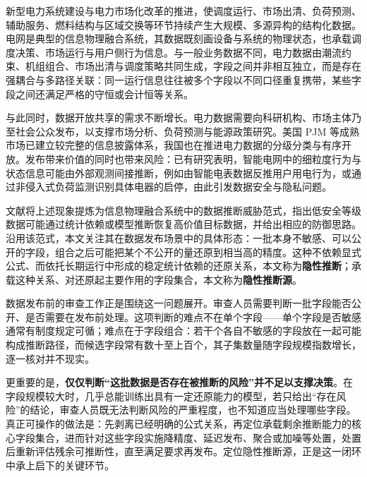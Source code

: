 \documentclass[UTF8,zihao=5,twoside]{ctexart}
\begin{document}
新型电力系统建设与电力市场化改革的推进，使调度运行、市场出清、负荷预测、辅助服务、燃料结构与区域交换等环节持续产生大规模、多源异构的结构化数据\cite{ref-liu-cps,ref-ma-pjm}。电网是典型的信息物理融合系统，其数据既刻画设备与系统的物理状态，也承载调度决策、市场运行与用户侧行为信息。与一般业务数据不同，电力数据由潮流约束、机组组合、市场出清与调度策略共同生成，字段之间并非相互独立，而是存在强耦合与多路径关联：同一运行信息往往被多个字段以不同口径重复携带，某些字段之间还满足严格的守恒或会计恒等关系。

与此同时，数据开放共享的需求不断增长。电力数据需要向科研机构、市场主体乃至社会公众发布，以支撑市场分析、负荷预测与能源政策研究\cite{ref-zhu-sharing}。美国 PJM 等成熟市场已建立较完整的信息披露体系\cite{ref-ma-pjm,ref-pjm-dataminer}，我国也在推进电力数据的分级分类与有序开放。发布带来价值的同时也带来风险：已有研究表明，智能电网中的细粒度行为与状态信息可能由外部观测间接推断，例如由智能电表数据反推用户用电行为\cite{ref-sankar,ref-giaconi}，或通过非侵入式负荷监测识别具体电器的启停\cite{ref-chen-privacy}，由此引发数据安全与隐私问题\cite{ref-adewole,ref-zhang-sgcc}。

文献\cite{ref-liu-data-inference}将上述现象提炼为信息物理融合系统中的数据推断威胁范式，指出低安全等级数据可能通过统计依赖或模型推断恢复高价值目标数据，并给出相应的防御思路。沿用该范式，本文关注其在数据发布场景中的具体形态：一批本身不敏感、可以公开的字段，组合之后可能把某个不公开的量还原到相当高的精度。这种不依赖显式公式、而依托长期运行中形成的稳定统计依赖的还原关系，本文称为\textbf{隐性推断}；承载这种关系、对还原起主要作用的字段集合，本文称为\textbf{隐性推断源}。

数据发布前的审查工作正是围绕这一问题展开。审查人员需要判断一批字段能否公开、是否需要在发布前处理。这项判断的难点不在单个字段——单个字段是否敏感通常有制度规定可循；难点在于字段组合：若干个各自不敏感的字段放在一起可能构成推断路径，而候选字段常有数十至上百个，其子集数量随字段规模指数增长，逐一核对并不现实。

更重要的是，\textbf{仅仅判断“这批数据是否存在被推断的风险”并不足以支撑决策}。在字段规模较大时，几乎总能训练出具有一定还原能力的模型，若只给出“存在风险”的结论，审查人员既无法判断风险的严重程度，也不知道应当处理哪些字段。真正可操作的做法是：先剥离已经明确的公式关系，再定位承载剩余推断能力的核心字段集合，进而针对这些字段实施降精度、延迟发布、聚合或加噪等处置，处置后重新评估残余可推断性，直至满足要求再发布。定位隐性推断源，正是这一闭环中承上启下的关键环节。
\end{document}
